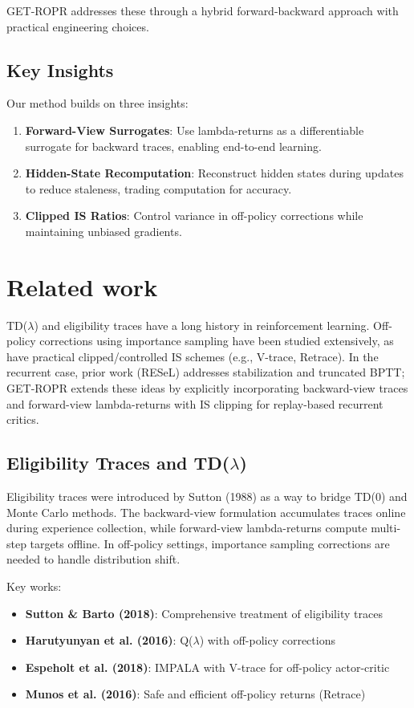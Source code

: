 \documentclass{article}
\begin{document}
GET-ROPR addresses these through a hybrid forward-backward approach with practical
engineering choices.

\subsection{Key Insights}
Our method builds on three insights:
\begin{enumerate}
  \item \textbf{Forward-View Surrogates}: Use lambda-returns as a differentiable surrogate
  for backward traces, enabling end-to-end learning.
  
  \item \textbf{Hidden-State Recomputation}: Reconstruct hidden states during updates
  to reduce staleness, trading computation for accuracy.
  
  \item \textbf{Clipped IS Ratios}: Control variance in off-policy corrections while
  maintaining unbiased gradients.
\end{enumerate}

\section{Related work}
TD($\lambda$) and eligibility traces have a long history in reinforcement learning.
Off-policy corrections using importance sampling have been studied extensively, as have
practical clipped/controlled IS schemes (e.g., V-trace, Retrace). In the recurrent
case, prior work (RESeL) addresses stabilization and truncated BPTT; GET-ROPR extends
these ideas by explicitly incorporating backward-view traces and forward-view lambda-returns
with IS clipping for replay-based recurrent critics.

\subsection{Eligibility Traces and TD($\lambda$)}
Eligibility traces were introduced by Sutton (1988) as a way to bridge TD(0) and Monte Carlo
methods. The backward-view formulation accumulates traces online during experience collection,
while forward-view lambda-returns compute multi-step targets offline. In off-policy settings,
importance sampling corrections are needed to handle distribution shift.

Key works:
\begin{itemize}
  \item \textbf{Sutton \& Barto (2018)}: Comprehensive treatment of eligibility traces
  \item \textbf{Harutyunyan et al. (2016)}: Q($\lambda$) with off-policy corrections
  \item \textbf{Espeholt et al. (2018)}: IMPALA with V-trace for off-policy actor-critic
  \item \textbf{Munos et al. (2016)}: Safe and efficient off-policy returns (Retrace)
\end{itemize}
\end{document}
